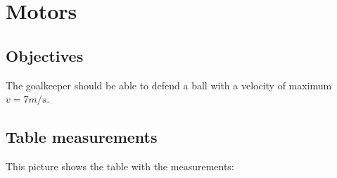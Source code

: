 \section{Motors}\label{sec:motors}

\subsection{Objectives}\label{subsec:objectives}
The goalkeeper should be able to defend a ball with a velocity of maximum $v=7m/s$.

\subsection{Table measurements}\label{subsec:table_measurements}
This picture shows the table with the measurements:

